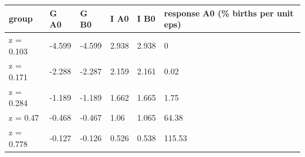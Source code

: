 \begingroup\small
\setlength{\tabcolsep}{3pt}
\renewcommand{\arraystretch}{1.04}
\begin{tabularx}{\linewidth}{XXXXXX}
\toprule
group & G A0 & G B0 & I A0 & I B0 & response A0 (\% births per unit eps) \\
\midrule
z = 0.103 & -4.599 & -4.599 & 2.938 & 2.938 & 0 \\
z = 0.171 & -2.288 & -2.287 & 2.159 & 2.161 & 0.02 \\
z = 0.284 & -1.189 & -1.189 & 1.662 & 1.665 & 1.75 \\
z = 0.47 & -0.468 & -0.467 & 1.06 & 1.065 & 64.38 \\
z = 0.778 & -0.127 & -0.126 & 0.526 & 0.538 & 115.53 \\
\bottomrule
\end{tabularx}
\endgroup
